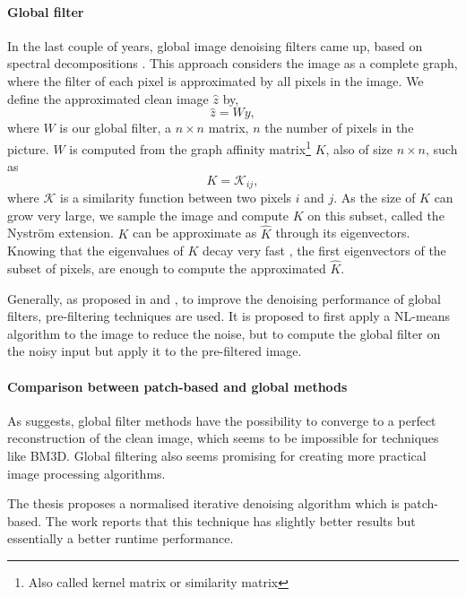 \paragraph{Global filter}

In the last couple of years, global image denoising filters came up, based on spectral decompositions \cite{glide_2014}.
This approach considers the image as a complete graph, where the filter of each pixel is approximated by all pixels in the image.
We define the approximated clean image \(\hat{z}\) by,
\[\hat{z} = Wy,\]
where \(W\) is our global filter, a \(n \times n\) matrix, \(n\) the number of pixels in the picture.
\(W\) is computed from the graph affinity matrix\footnote{Also called kernel matrix or similarity matrix} \(K\), also of size \(n \times n\), such as
\[K = {\mathcal{K}_{ij}},\]
where \(\mathcal{K}\) is a similarity function between two pixels \(i\) and \(j\).
As the size of \(K\) can grow very large, we sample the image and compute \(K\) on this subset, called the Nystr\"om extension.
\(K\) can be approximate as \(\hat{K}\) through its eigenvectors.
Knowing that the eigenvalues of \(K\) decay very fast \cite{siam_slides_2016}, the first eigenvectors of the subset of pixels, are enough to compute the approximated \(\hat{K}\).

Generally, as proposed in \cite{glide_2014} and \cite{talebi_asymptotic_2016}, to improve the denoising performance of global filters, pre-filtering techniques are used.
It is proposed to first apply a NL-means algorithm to the image to reduce the noise, but to compute the global filter on the noisy input but apply it to the pre-filtered image.

\paragraph{Comparison between patch-based and global methods}

As \cite{talebi_asymptotic_2016} suggests, global filter methods have the possibility to converge to a perfect reconstruction of the clean image, which seems to be impossible for techniques like BM3D.
Global filtering also seems promising for creating more practical image processing algorithms.

The thesis \cite{kheradmand_graph-based_2016} proposes a normalised iterative denoising algorithm which is patch-based.
The work reports that this technique has slightly better results but essentially a better runtime performance.
